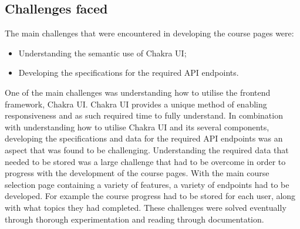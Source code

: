 \subsection{Challenges faced}
The main challenges that were encountered in developing the course pages were:
\begin{itemize}
    \item Understanding the semantic use of Chakra UI;
    \item Developing the specifications for the required API endpoints.
\end{itemize}
One of the main challenges was understanding how to utilise the frontend framework, Chakra UI. 
Chakra UI provides a unique method of enabling responsiveness and as such required time to fully understand.
In combination with understanding how to utilise Chakra UI and its several components, developing the specifications and data for the required API endpoints was an aspect that was found to be challenging.
Understanding the required data that needed to be stored was a large challenge that had to be overcome in order to progress with the development of the course pages.
With the main course selection page containing a variety of features, a variety of endpoints had to be developed.
For example the course progress had to be stored for each user, along with what topics they had completed.
These challenges were solved eventually through thorough experimentation and reading through documentation.